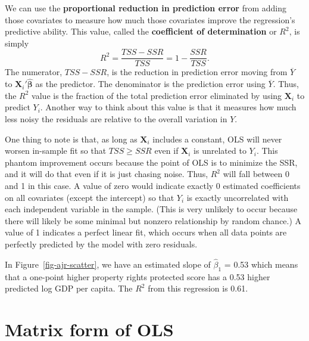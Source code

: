\documentclass[
  13pt,
  letterpaper,
  DIV=11,
  numbers=noendperiod]{scrreprt}
\newcommand{\mb}{\bm}
\newcommand{\X}{\mb{X}}
\newcommand{\bhat}{\widehat{\mb{\beta}}}
\theoremstyle{plain}
\theoremstyle{plain}
\theoremstyle{definition}
\theoremstyle{definition}
\theoremstyle{remark}
\begin{document}
We can use the \textbf{proportional reduction in prediction error} from
adding those covariates to measure how much those covariates improve the
regression's predictive ability. This value, called the
\textbf{coefficient of determination} or \(R^2\), is simply \[
R^2 = \frac{TSS - SSR}{TSS} = 1-\frac{SSR}{TSS}.
\] The numerator, \(TSS - SSR\), is the reduction in prediction error
moving from \(\overline{Y}\) to \(\X_i'\bhat\) as the predictor. The
denominator is the prediction error using \(\overline{Y}\). Thus, the
\(R^2\) value is the fraction of the total prediction error eliminated
by using \(\X_i\) to predict \(Y_i\). Another way to think about this
value is that it measures how much less noisy the residuals are relative
to the overall variation in \(Y\).

One thing to note is that, as long as \(\X_i\) includes a constant, OLS
will never worsen in-sample fit so that \(TSS \geq SSR\) even if
\(\X_i\) is unrelated to \(Y_i\). This phantom improvement occurs
because the point of OLS is to minimize the SSR, and it will do that
even if it is just chasing noise. Thus, \(R^2\) will fall between 0 and
1 in this case. A value of zero would indicate exactly 0 estimated
coefficients on all covariates (except the intercept) so that \(Y_i\) is
exactly uncorrelated with each independent variable in the sample. (This
is very unlikely to occur because there will likely be some minimal but
nonzero relationship by random chance.) A value of 1 indicates a perfect
linear fit, which occurs when all data points are perfectly predicted by
the model with zero residuals.

In Figure~\ref{fig-ajr-scatter}, we have an estimated slope of
\(\widehat{\beta}_1\) = 0.53 which means that a one-point higher
property rights protected score has a 0.53 higher predicted log GDP per
capita. The \(R^2\) from this regression is 0.61.

\section{Matrix form of OLS}\label{matrix-form-of-ols}
\end{document}
